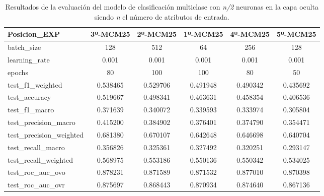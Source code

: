 \begin{table}[H]
\begin{tabular}{|>{\columncolor[HTML]{E0FFFF}}l|c|c|c|c|c|}
\hline
Posicion\_EXP & 3º-MCM25 & 2º-MCM25 & 1º-MCM25 & 4º-MCM25 & 5º-MCM25 \\
\hline
\cellcolor[HTML]{E0FFFF}batch\_size & \cellcolor[HTML]{66ffa8}128 & \cellcolor[HTML]{66ffa8}512 & \cellcolor[HTML]{66ffa8}64 & \cellcolor[HTML]{66ffa8}256 & \cellcolor[HTML]{66ffa8}128 \\
\cellcolor[HTML]{E0FFFF}learning\_rate & \cellcolor[HTML]{f99595}0.001 & \cellcolor[HTML]{f99595}0.001 & \cellcolor[HTML]{f99595}0.001 & \cellcolor[HTML]{f99595}0.001 & \cellcolor[HTML]{f99595}0.001 \\
\cellcolor[HTML]{E0FFFF}epochs & \cellcolor[HTML]{b1bafb}80 & \cellcolor[HTML]{b1bafb}100 & \cellcolor[HTML]{b1bafb}100 & \cellcolor[HTML]{b1bafb}80 & \cellcolor[HTML]{b1bafb}50 \\
\cellcolor[HTML]{E0FFFF}test\_f1\_weighted & 0.538465 & 0.529706 & 0.491948 & 0.490342 & 0.435692 \\
\cellcolor[HTML]{E0FFFF}test\_accuracy & 0.519667 & 0.498341 & 0.463631 & 0.458354 & 0.406536 \\
\cellcolor[HTML]{E0FFFF}test\_f1\_macro & 0.371639 & 0.340072 & 0.339593 & 0.333974 & 0.305804 \\
\cellcolor[HTML]{E0FFFF}test\_precision\_macro & 0.415200 & 0.384902 & 0.376401 & 0.374790 & 0.354471 \\
\cellcolor[HTML]{E0FFFF}test\_precision\_weighted & 0.681380 & 0.670107 & 0.642648 & 0.646698 & 0.640704 \\
\cellcolor[HTML]{E0FFFF}test\_recall\_macro & 0.356826 & 0.325361 & 0.327492 & 0.320251 & 0.293147 \\
\cellcolor[HTML]{E0FFFF}test\_recall\_weighted & 0.568975 & 0.553186 & 0.550136 & 0.550342 & 0.534025 \\
\cellcolor[HTML]{E0FFFF}test\_roc\_auc\_ovo & 0.878231 & 0.871589 & 0.871532 & 0.877010 & 0.870398 \\
\cellcolor[HTML]{E0FFFF}test\_roc\_auc\_ovr & 0.875697 & 0.868443 & 0.870934 & 0.874640 & 0.867136 \\
\hline
\end{tabular}
    \caption{Resultados de la evaluación del modelo de clasificación multiclase con \textit{n/2} neuronas en la capa oculta siendo \textit{n} el número de atributos de entrada.}
    \label{fig:EVALMCM25}
\end{table}


